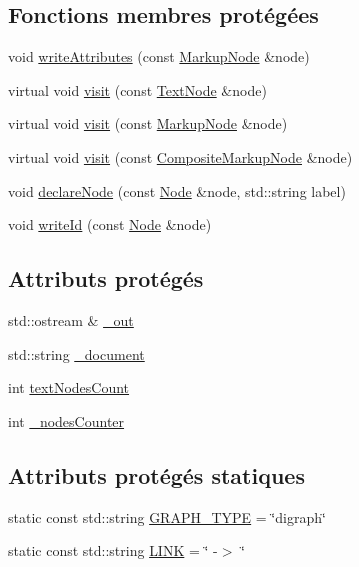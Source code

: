 \subsection*{Fonctions membres protégées}
\begin{DoxyCompactItemize}
\item 
void \hyperlink{classxml_1_1_dot_output_visitor_a8c9f18ff770920e75f040dff46570f0c}{writeAttributes} (const \hyperlink{classxml_1_1_markup_node}{MarkupNode} \&node)
\item 
virtual void \hyperlink{classxml_1_1_dot_output_visitor_ad18c9818c42e6d0f515fa583d1a01ec8}{visit} (const \hyperlink{classxml_1_1_text_node}{TextNode} \&node)
\item 
virtual void \hyperlink{classxml_1_1_dot_output_visitor_a2744dca685af0e8a420624c48f7eea53}{visit} (const \hyperlink{classxml_1_1_markup_node}{MarkupNode} \&node)
\item 
virtual void \hyperlink{classxml_1_1_dot_output_visitor_a1755fb782d2d50ab28dc41045e60c69b}{visit} (const \hyperlink{classxml_1_1_composite_markup_node}{CompositeMarkupNode} \&node)
\item 
void \hyperlink{classxml_1_1_dot_output_visitor_abc55a0a0143a2ec38adb43ceacc5c244}{declareNode} (const \hyperlink{classxml_1_1_node}{Node} \&node, std::string label)
\item 
void \hyperlink{classxml_1_1_dot_output_visitor_a4df18e8a595e20fd1a7d6f48fe7865fb}{writeId} (const \hyperlink{classxml_1_1_node}{Node} \&node)
\end{DoxyCompactItemize}
\subsection*{Attributs protégés}
\begin{DoxyCompactItemize}
\item 
std::ostream \& \hyperlink{classxml_1_1_dot_output_visitor_a5bd82f9f1db24368e579e075a1929ca6}{\_\-out}
\item 
std::string \hyperlink{classxml_1_1_dot_output_visitor_a7ff9e32ea1c710644289ef6f8479f872}{\_\-document}
\item 
int \hyperlink{classxml_1_1_dot_output_visitor_a65f377e3a153b5cec4ba84a3c70c8d29}{textNodesCount}
\item 
int \hyperlink{classxml_1_1_dot_output_visitor_a250aac727f10406e22c019cc262f3327}{\_\-nodesCounter}
\end{DoxyCompactItemize}
\subsection*{Attributs protégés statiques}
\begin{DoxyCompactItemize}
\item 
static const std::string \hyperlink{classxml_1_1_dot_output_visitor_a5cf6c70f78fa4edced8f89d18b95c0d0}{GRAPH\_\-TYPE} = \char`\"{}digraph\char`\"{}
\item 
static const std::string \hyperlink{classxml_1_1_dot_output_visitor_a0df19df5cbdc9101aad2e71d2e87c33c}{LINK} = \char`\"{} -\/$>$ \char`\"{}
\end{DoxyCompactItemize}


